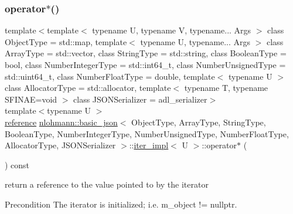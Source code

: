 \subsubsection{\texorpdfstring{operator$\ast$()}{operator*()}}
{\footnotesize\ttfamily template$<$template$<$ typename U, typename V, typename... Args $>$ class Object\+Type = std\+::map, template$<$ typename U, typename... Args $>$ class Array\+Type = std\+::vector, class String\+Type  = std\+::string, class Boolean\+Type  = bool, class Number\+Integer\+Type  = std\+::int64\+\_\+t, class Number\+Unsigned\+Type  = std\+::uint64\+\_\+t, class Number\+Float\+Type  = double, template$<$ typename U $>$ class Allocator\+Type = std\+::allocator, template$<$ typename T, typename S\+F\+I\+N\+A\+E=void $>$ class J\+S\+O\+N\+Serializer = adl\+\_\+serializer$>$ \\
template$<$typename U $>$ \\
\hyperlink{classnlohmann_1_1basic__json_1_1iter__impl_ae09599e9cb4a947020a0265c0c4f3d5e}{reference} \hyperlink{classnlohmann_1_1basic__json}{nlohmann\+::basic\+\_\+json}$<$ Object\+Type, Array\+Type, String\+Type, Boolean\+Type, Number\+Integer\+Type, Number\+Unsigned\+Type, Number\+Float\+Type, Allocator\+Type, J\+S\+O\+N\+Serializer $>$\+::\hyperlink{classnlohmann_1_1basic__json_1_1iter__impl}{iter\+\_\+impl}$<$ U $>$\+::operator$\ast$ (\begin{DoxyParamCaption}{ }\end{DoxyParamCaption}) const\hspace{0.3cm}{\ttfamily [inline]}}



return a reference to the value pointed to by the iterator 

\begin{DoxyPrecond}{Precondition}
The iterator is initialized; i.\+e. {\ttfamily m\+\_\+object != nullptr}. 
\end{DoxyPrecond}
\mbox{\label{classnlohmann_1_1basic__json_1_1iter__impl_a3b4cd7db9a93609f8e05f1759d38d633}} 

